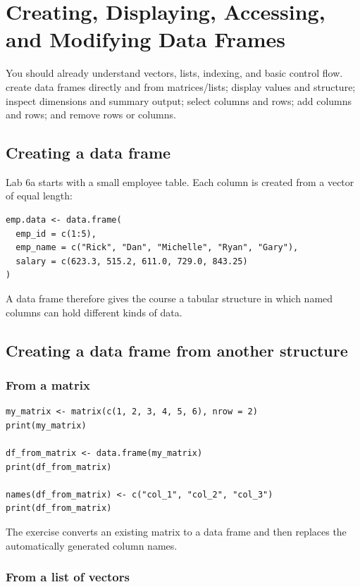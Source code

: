 \chapter{Creating, Displaying, Accessing, and Modifying Data Frames}
\label{chap:data-frames}

\chapterguide
  {You should already understand vectors, lists, indexing, and basic control flow.}
  {create data frames directly and from matrices/lists; display values and structure; inspect dimensions and summary output; select columns and rows; add columns and rows; and remove rows or columns.}

\section{Creating a data frame}

Lab 6a starts with a small employee table. Each column is created from a vector of equal length:

\begin{lstlisting}[style=dsr]
emp.data <- data.frame(
  emp_id = c(1:5),
  emp_name = c("Rick", "Dan", "Michelle", "Ryan", "Gary"),
  salary = c(623.3, 515.2, 611.0, 729.0, 843.25)
)
\end{lstlisting}

A data frame therefore gives the course a tabular structure in which named columns can hold different kinds of data.

\section{Creating a data frame from another structure}

\subsection{From a matrix}

\begin{lstlisting}[style=dsr]
my_matrix <- matrix(c(1, 2, 3, 4, 5, 6), nrow = 2)
print(my_matrix)

df_from_matrix <- data.frame(my_matrix)
print(df_from_matrix)

names(df_from_matrix) <- c("col_1", "col_2", "col_3")
print(df_from_matrix)
\end{lstlisting}

The exercise converts an existing matrix to a data frame and then replaces the automatically generated column names.

\subsection{From a list of vectors}

